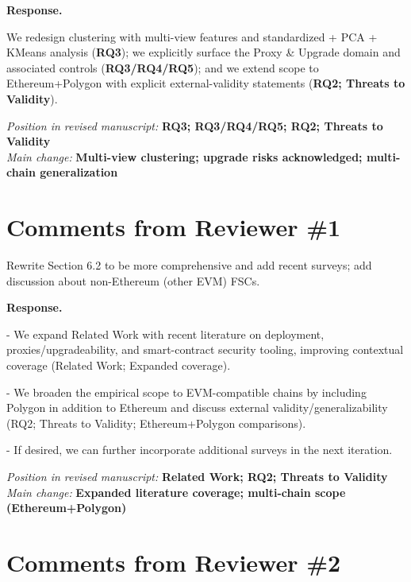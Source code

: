 \documentclass[acmsmall]{acmart}
\begin{document}
	\noindent
	\textbf{Response.}

	We redesign clustering with multi-view features and standardized + PCA + KMeans analysis ({\textbf{RQ3}});
	we explicitly surface the Proxy \& Upgrade domain and associated controls ({\textbf{RQ3/RQ4/RQ5}});
	and we extend scope to Ethereum+Polygon with explicit external-validity statements ({\textbf{RQ2; Threats to Validity}}).

	\vspace{0.25em}
	\noindent
	\textit{Position in revised manuscript:}
	{\color{red}\textbf{RQ3; RQ3/RQ4/RQ5; RQ2; Threats to Validity}}\\ \textit{Main change:}
	{\color{blue}\textbf{Multi-view clustering; upgrade risks acknowledged; multi-chain generalization}}

	\newpage
	\section{Comments from Reviewer \#1}

	\begin{tcolorbox}
		[commentbox,title=Reviewer \#1 -- Comment 1] Rewrite Section 6.2 to be more comprehensive and
		add recent surveys; add discussion about non-Ethereum (other EVM) FSCs.
	\end{tcolorbox}

	\noindent
	\textbf{Response.}

	- We expand Related Work with recent literature on deployment, proxies/upgradeability, and smart-contract
	security tooling, improving contextual coverage (Related Work; Expanded coverage).

	- We broaden the empirical scope to EVM-compatible chains by including Polygon in addition to Ethereum
	and discuss external validity/generalizability (RQ2; Threats to Validity; Ethereum+Polygon
	comparisons).

	- If desired, we can further incorporate additional surveys in the next iteration.

	\vspace{0.25em}
	\noindent
	\textit{Position in revised manuscript:} {\color{red}\textbf{Related Work; RQ2; Threats to Validity}}\\
	\textit{Main change:} {\color{blue}\textbf{Expanded literature coverage; multi-chain scope (Ethereum+Polygon)}}

	\newpage
	\section{Comments from Reviewer \#2}
\end{document}
